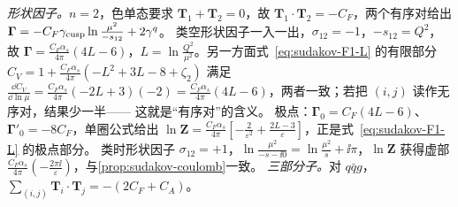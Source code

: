 \begin{example}[两部分子情形与色守恒]\label{ex:sudakov-dipole-twoparton}
\emph{形状因子。}$n=2$，色单态要求 $\mathbf T_1+\mathbf T_2=0$，故 $\mathbf T_1\cdot\mathbf T_2=-C_F$，两个有序对给出 $\boldsymbol\Gamma=-C_F\gamma_{\rm cusp}\ln\frac{\mu^2}{-s_{12}}+2\gamma^q$。
类空形状因子一入一出，$\sigma_{12}=-1$，$-s_{12}=Q^2$，故 $\boldsymbol\Gamma=\frac{C_F\alpha_s}{4\pi}(4L-6)$，$L=\ln\frac{Q^2}{\mu^2}$。另一方面式~\eqref{eq:sudakov-F1-L} 的有限部分
$C_V=1+\frac{C_F\alpha_s}{4\pi}(-L^2+3L-8+\zeta_2)$ 满足 $\frac{\dd C_V}{\dd\ln\mu}=\frac{C_F\alpha_s}{4\pi}(-2L+3)(-2)=\frac{C_F\alpha_s}{4\pi}(4L-6)$，两者一致；若把 $(i,j)$ 读作无序对，结果少一半——
这就是“有序对”的含义。%
极点：$\boldsymbol\Gamma_0=C_F(4L-6)$、$\boldsymbol\Gamma'_0=-8C_F$，单圈公式给出 $\ln\mathbf Z=\frac{C_F\alpha_s}{4\pi}[-\frac2{\varepsilon^2}+\frac{2L-3}\varepsilon]$，正是式~\eqref{eq:sudakov-F1-L} 的极点部分。
类时形状因子 $\sigma_{12}=+1$，$\ln\frac{\mu^2}{-s-\ii0}=\ln\frac{\mu^2}{s}+\ii\pi$，$\ln\mathbf Z$ 获得虚部 $\frac{C_F\alpha_s}{4\pi}(-\frac{2\pi\ii}\varepsilon)$，与\cref{prop:sudakov-coulomb}一致。
\emph{三部分子。}对 $q\bar qg$，$\sum_{(i,j)}\mathbf T_i\cdot\mathbf T_j=-(2C_F+C_A)$。%
\end{example}


